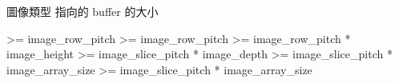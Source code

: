 \bTABLE[option=stretch]

\bTABLEhead
  \bTR[background=color,backgroundcolor=gray]
    \bTH 圖像類型 \eTH
    \bTH {} 指向的 buffer 的大小 \eTH
  \eTR
\eTABLEhead

\bTABLEbody
  \bTR
    \bTD {} \eTD
    \bTD >= image_row_pitch \eTD
  \eTR
  \bTR
    \bTD {} \eTD
    \bTD >= image_row_pitch \eTD
  \eTR
  \bTR
    \bTD {} \eTD
    \bTD >= image_row_pitch * image_height \eTD
  \eTR
  \bTR
    \bTD {} \eTD
    \bTD >= image_slice_pitch * image_depth \eTD
  \eTR
  \bTR
    \bTD {} \eTD
    \bTD >= image_slice_pitch * image_array_size \eTD
  \eTR
  \bTR
    \bTD {} \eTD
    \bTD >= image_slice_pitch * image_array_size \eTD
  \eTR
\eTABLEbody

\eTABLE
